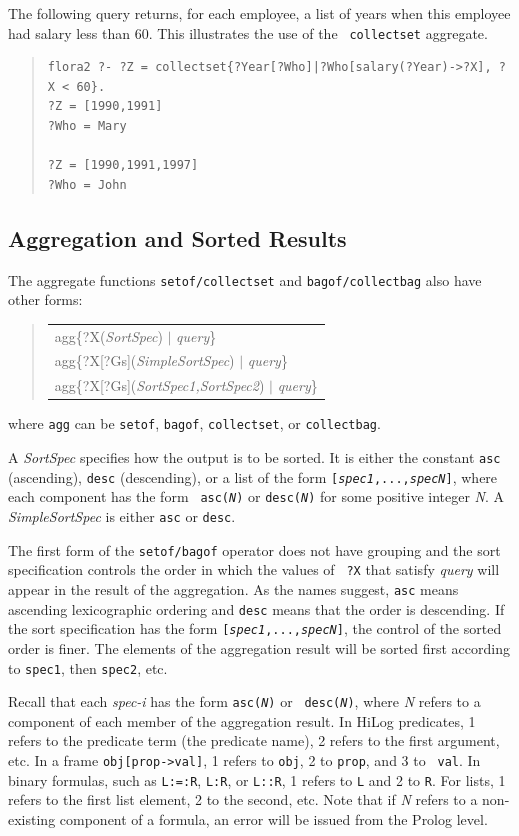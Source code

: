 \documentclass[11pt]{article}
\newenvironment{qrules}{\begin{quote}\tt\begin{tabular}[t]{l}}%
{\end{tabular}\end{quote}}
\begin{document}
The following query returns, for each employee, a list of years when this
employee had salary less than 60. This illustrates the use of the {\tt
  collectset} aggregate.
\begin{quote}
\begin{verbatim}
flora2 ?- ?Z = collectset{?Year[?Who]|?Who[salary(?Year)->?X], ?X < 60}.
?Z = [1990,1991]
?Who = Mary

?Z = [1990,1991,1997]
?Who = John
\end{verbatim}
\end{quote}

\subsection {Aggregation and Sorted Results}

The aggregate functions {\tt setof/collectset} and {\tt bagof/collectbag}
also have other forms:  
\begin{qrules}
agg\{?X({\it SortSpec}) $|$ {\it query}\}\\
agg\{?X[?Gs]({\it SimpleSortSpec}) $|$ {\it query}\}\\
agg\{?X[?Gs]({\it SortSpec1,SortSpec2}) $|$ {\it query}\}
\end{qrules}
where {\tt agg} can be {\tt setof}, {\tt bagof}, {\tt collectset}, or
{\tt collectbag}.     

A {\it SortSpec} specifies how the output is to be sorted. It is either the
constant {\tt asc} (ascending), {\tt desc} (descending), or a list of the
form {\tt [{\it spec1},...,{\it specN}]}, where each component has the form {\tt
  asc({\it N})} or {\tt desc({\it N})} for some positive integer {\it N}.      
A {\it SimpleSortSpec} is either {\tt asc} or {\tt desc}.   

The first form of the {\tt setof/bagof} operator does not have grouping 
and the sort specification controls the order in which the values of {\tt
  ?X} that satisfy {\it query} will appear in the result of the aggregation.
As the names suggest, {\tt asc} means ascending
lexicographic ordering and {\tt desc} means that the order is descending.  
If the sort specification has the form {\tt [{\it spec1},...,{\it specN}]},
the control of the sorted order is finer. The elements of the aggregation
result will be sorted first according to {\tt spec1}, then {\tt spec2}, etc.

Recall that each \emph{spec-i}  has the form {\tt asc({\it N})} or {\tt
  desc({\it N})}, where \emph{N} refers to a component of each
member of the aggregation result. In HiLog predicates, 1 refers to the predicate term
(the predicate name), 2 refers to the first argument, etc. In a frame
{\tt obj[prop->val]}, 1 refers to {\tt obj}, 2 to {\tt prop}, and 3 to {\tt
  val}. In binary formulas, such as {\tt L:=:R}, {\tt L:R}, or {\tt L::R},
1 refers to {\tt L} and 2 to {\tt R}.  
For lists, 1 refers to the first list element, 2 to the second, etc.
Note that if {\it N} refers to a non-existing component of a formula, an
error will be issued from the Prolog level.
\end{document}
